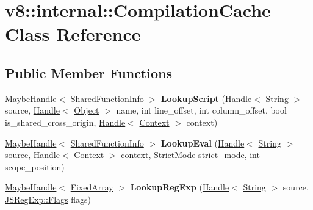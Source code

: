 \hypertarget{classv8_1_1internal_1_1_compilation_cache}{}\section{v8\+:\+:internal\+:\+:Compilation\+Cache Class Reference}
\label{classv8_1_1internal_1_1_compilation_cache}
\subsection*{Public Member Functions}
\begin{DoxyCompactItemize}
\item 
\hypertarget{classv8_1_1internal_1_1_compilation_cache_a57a5d9ecada584bb628d576083a6de5a}{}\hyperlink{classv8_1_1internal_1_1_maybe_handle}{Maybe\+Handle}$<$ \hyperlink{classv8_1_1internal_1_1_shared_function_info}{Shared\+Function\+Info} $>$ {\bfseries Lookup\+Script} (\hyperlink{classv8_1_1internal_1_1_handle}{Handle}$<$ \hyperlink{classv8_1_1internal_1_1_string}{String} $>$ source, \hyperlink{classv8_1_1internal_1_1_handle}{Handle}$<$ \hyperlink{classv8_1_1internal_1_1_object}{Object} $>$ name, int line\+\_\+offset, int column\+\_\+offset, bool is\+\_\+shared\+\_\+cross\+\_\+origin, \hyperlink{classv8_1_1internal_1_1_handle}{Handle}$<$ \hyperlink{classv8_1_1internal_1_1_context}{Context} $>$ context)\label{classv8_1_1internal_1_1_compilation_cache_a57a5d9ecada584bb628d576083a6de5a}

\item 
\hypertarget{classv8_1_1internal_1_1_compilation_cache_a70553c1dc7dffc5eeb77ab66135f9d3b}{}\hyperlink{classv8_1_1internal_1_1_maybe_handle}{Maybe\+Handle}$<$ \hyperlink{classv8_1_1internal_1_1_shared_function_info}{Shared\+Function\+Info} $>$ {\bfseries Lookup\+Eval} (\hyperlink{classv8_1_1internal_1_1_handle}{Handle}$<$ \hyperlink{classv8_1_1internal_1_1_string}{String} $>$ source, \hyperlink{classv8_1_1internal_1_1_handle}{Handle}$<$ \hyperlink{classv8_1_1internal_1_1_context}{Context} $>$ context, Strict\+Mode strict\+\_\+mode, int scope\+\_\+position)\label{classv8_1_1internal_1_1_compilation_cache_a70553c1dc7dffc5eeb77ab66135f9d3b}

\item 
\hypertarget{classv8_1_1internal_1_1_compilation_cache_a3936c774ccd71fa0be44b4c01c234e9b}{}\hyperlink{classv8_1_1internal_1_1_maybe_handle}{Maybe\+Handle}$<$ \hyperlink{classv8_1_1internal_1_1_fixed_array}{Fixed\+Array} $>$ {\bfseries Lookup\+Reg\+Exp} (\hyperlink{classv8_1_1internal_1_1_handle}{Handle}$<$ \hyperlink{classv8_1_1internal_1_1_string}{String} $>$ source, \hyperlink{classv8_1_1internal_1_1_j_s_reg_exp_1_1_flags}{J\+S\+Reg\+Exp\+::\+Flags} flags)\label{classv8_1_1internal_1_1_compilation_cache_a3936c774ccd71fa0be44b4c01c234e9b}


\end{DoxyCompactItemize}

